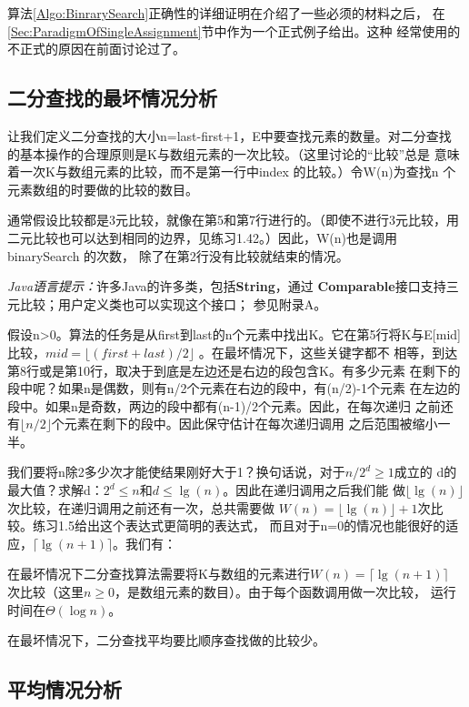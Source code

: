 算法\ref{Algo:BinrarySearch}正确性的详细证明在介绍了一些必须的材料之后，
在\ref{Sec:ParadigmOfSingleAssignment}节中作为一个正式例子给出。这种
经常使用的不正式的原因在前面讨论过了。

\subsection{二分查找的最坏情况分析}
让我们定义二分查找的大小n=last-first+1，E中要查找元素的数量。对二分查找
的基本操作的合理原则是K与数组元素的一次比较。（这里讨论的“比较”总是
意味着一次K与数组元素的比较，而不是第一行中index 的比较。）令W(n)为查找n
个元素数组的时要做的比较的数目。

通常假设比较都是3元比较，就像在第5和第7行进行的。（即使不进行3元比较，用
二元比较也可以达到相同的边界，见练习1.42。）因此，W(n)也是调用binarySearch
的次数， 除了在第2行没有比较就结束的情况。

\textit{Java语言提示：}许多Java的许多类，包括\textbf{String}，通过
\textbf{Comparable}接口支持三元比较；用户定义类也可以实现这个接口；
参见附录A。

假设n>0。算法的任务是从first到last的n个元素中找出K。它在第5行将K与E[mid]
比较，$mid=\lfloor(first+last)/2\rfloor$ 。在最坏情况下，这些关键字都不
相等，到达第8行或是第10行，取决于到底是左边还是右边的段包含K。有多少元素
在剩下的段中呢？如果n是偶数，则有n/2个元素在右边的段中，有(n/2)-1个元素
在左边的段中。如果n是奇数，两边的段中都有(n-1)/2个元素。因此，在每次递归
之前还有$\lfloor n/2\rfloor$个元素在剩下的段中。因此保守估计在每次递归调用
之后范围被缩小一半。

我们要将n除2多少次才能使结果刚好大于1？换句话说，对于$n/2^d\geq 1$成立的
d的最大值？求解d：$2^d\leq n$和$d\leq \lg(n)$。因此在递归调用之后我们能
做$\lfloor\lg(n)\rfloor$次比较，在递归调用之前还有一次，总共需要做
$W(n)=\lfloor\lg(n)\rfloor+1$次比较。练习1.5给出这个表达式更简明的表达式，
而且对于n=0的情况也能很好的适应，$\lceil\lg(n+1)\rceil$。我们有：

\begin{theorem}
在最坏情况下二分查找算法需要将K与数组的元素进行$W(n)=\lceil\lg(n+1)\rceil$
次比较（这里$n\geq 0$，是数组元素的数目）。由于每个函数调用做一次比较，
运行时间在$\Theta(\log n)$。
\end{theorem}

在最坏情况下，二分查找平均要比顺序查找做的比较少。

\subsection{平均情况分析}

